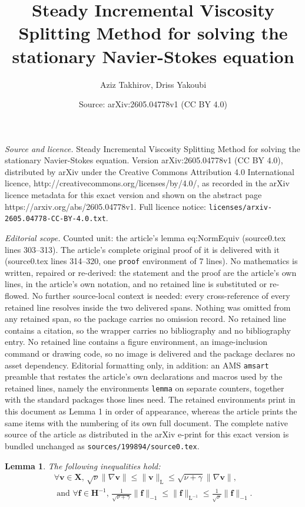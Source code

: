 \documentclass[10pt,a4paper]{amsart}
\title{Steady Incremental Viscosity Splitting Method for solving the stationary Navier-Stokes equation}
\author{Aziz Takhirov, Driss Yakoubi}
\date{Source: arXiv:2605.04778v1 (CC BY 4.0)}
\newtheorem{lemma}{Lemma}
\newcommand{\Linvmap}{\mathrm{L^{-1}}}
\newcommand{\Lmap}{\mathrm{L}}
\def\V#1{\mathbf{#1}}
\begin{document}
\maketitle

\noindent\emph{Source and licence.} Steady Incremental Viscosity Splitting Method for solving the stationary Navier-Stokes equation. Version arXiv:2605.04778v1 (CC BY 4.0), distributed by arXiv under the Creative Commons Attribution 4.0 International licence, http://creativecommons.org/licenses/by/4.0/, as recorded in the arXiv licence metadata for this exact version and shown on the abstract page https://arxiv.org/abs/2605.04778v1. Full licence notice: \texttt{licenses/arxiv-2605.04778-CC-BY-4.0.txt}.\par\smallskip

\noindent\textit{Editorial scope.} Counted unit: the article's lemma eq:NormEquiv (source0.tex lines 303--313). The article's complete original proof of it is delivered with it (source0.tex lines 314--320, one \texttt{proof} environment of 7 lines). No mathematics is written, repaired or re-derived: the statement and the proof are the article's own lines, in the article's own notation, and no retained line is substituted or re-flowed.  No further source-local context is needed: every cross-reference of every retained line resolves inside the two delivered spans.  Nothing was omitted from any retained span, so the package carries no omission record.  No retained line contains a citation, so the wrapper carries no bibliography and no bibliography entry.  No retained line contains a figure environment, an image-inclusion command or drawing code, so no image is delivered and the package declares no asset dependency.  Editorial formatting only, in addition: an AMS \texttt{amsart} preamble that restates the article's own declarations and macros used by the retained lines, namely the environments \texttt{lemma} on separate counters, together with the standard packages those lines need.  The retained environments print in this document as Lemma 1 in order of appearance, whereas the article prints the same items with the numbering of its own full document.  The complete native source of the article as distributed in the arXiv e-print for this exact version is bundled unchanged as \texttt{sources/199894/source0.tex}.
\begin{lemma}
The following inequalities hold:
\begin{equation}
\begin{aligned}
\forall \V{v} \in \V{X}, \, \sqrt{\nu}\|\nabla \V{v}\| \le \| \V{v} \|_\Lmap \le \sqrt{\nu+\gamma} \|\nabla \V{v}\|, \\
\text{ and } \forall \V{f} \in \V{H}^{-1}, \, 
 \frac{1}{\sqrt{\nu+\gamma}}\| \V{f} \|_{-1} \le \| \V{f} \|_\Linvmap \le \frac{1}{\sqrt{\nu}} \| \V{f} \|_{-1}.
\end{aligned}
    \label{eq:NormEquiv}
\end{equation}    
\end{lemma}
\end{document}
